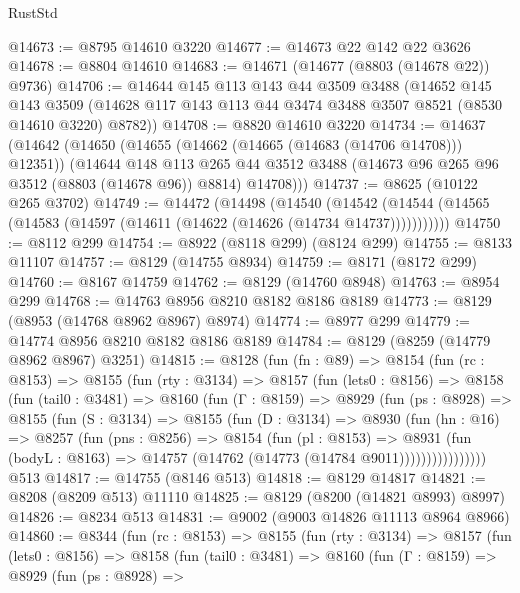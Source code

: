 \begin{lexlean}{RustStd}
\begin{coremodule}
@14673 := @8795 @14610 @3220
@14677 := @14673 @22 @142 @22 @3626
@14678 := @8804 @14610
@14683 := @14671 (@14677 (@8803 (@14678 @22)) @9736)
@14706 := @14644
    @145
    @113
    @143
    @44
    @3509
    @3488
    (@14652
      @145
      @143
      @3509
      (@14628 @117 @143 @113 @44 @3474 @3488 @3507 @8521 (@8530 @14610 @3220) @8782))
@14708 := @8820 @14610 @3220
@14734 := @14637
    (@14642
      (@14650
        (@14655 (@14662 (@14665 (@14683 (@14706 @14708))) @12351))
        (@14644
          @148
          @113
          @265
          @44
          @3512
          @3488
          (@14673 @96 @265 @96 @3512 (@8803 (@14678 @96)) @8814)
          @14708)))
@14737 := @8625 (@10122 @265 @3702)
@14749 := @14472
    (@14498
      (@14540
        (@14542 (@14544 (@14565 (@14583 (@14597 (@14611 (@14622 (@14626 (@14734 @14737)))))))))))
@14750 := @8112 @299
@14754 := @8922 (@8118 @299) (@8124 @299)
@14755 := @8133 @11107
@14757 := @8129 (@14755 @8934)
@14759 := @8171 (@8172 @299)
@14760 := @8167 @14759
@14762 := @8129 (@14760 @8948)
@14763 := @8954 @299
@14768 := @14763 @8956 @8210 @8182 @8186 @8189
@14773 := @8129 (@8953 (@14768 @8962 @8967) @8974)
@14774 := @8977 @299
@14779 := @14774 @8956 @8210 @8182 @8186 @8189
@14784 := @8129 (@8259 (@14779 @8962 @8967) @3251)
@14815 := @8128
    (fun (fn : @89) =>
    @8154
      (fun (rc : @8153) =>
      @8155
        (fun (rty : @3134) =>
        @8157
          (fun (lets0 : @8156) =>
          @8158
            (fun (tail0 : @3481) =>
            @8160
              (fun (Γ : @8159) =>
              @8929
                (fun (ps : @8928) =>
                @8155
                  (fun (S : @3134) =>
                  @8155
                    (fun (D : @3134) =>
                    @8930
                      (fun (hn : @16) =>
                      @8257
                        (fun (pns : @8256) =>
                        @8154
                          (fun (pl : @8153) =>
                          @8931
                            (fun (bodyL : @8163) =>
                            @14757 (@14762 (@14773 (@14784 @9011))))))))))))))))
    @513
@14817 := @14755 (@8146 @513)
@14818 := @8129 @14817
@14821 := @8208 (@8209 @513) @11110
@14825 := @8129 (@8200 (@14821 @8993) @8997)
@14826 := @8234 @513
@14831 := @9002 (@9003 @14826 @11113 @8964 @8966)
@14860 := @8344
    (fun (rc : @8153) =>
    @8155
      (fun (rty : @3134) =>
      @8157
        (fun (lets0 : @8156) =>
        @8158
          (fun (tail0 : @3481) =>
          @8160
            (fun (Γ : @8159) =>
            @8929
              (fun (ps : @8928) =>

\end{coremodule}
\end{lexlean}
